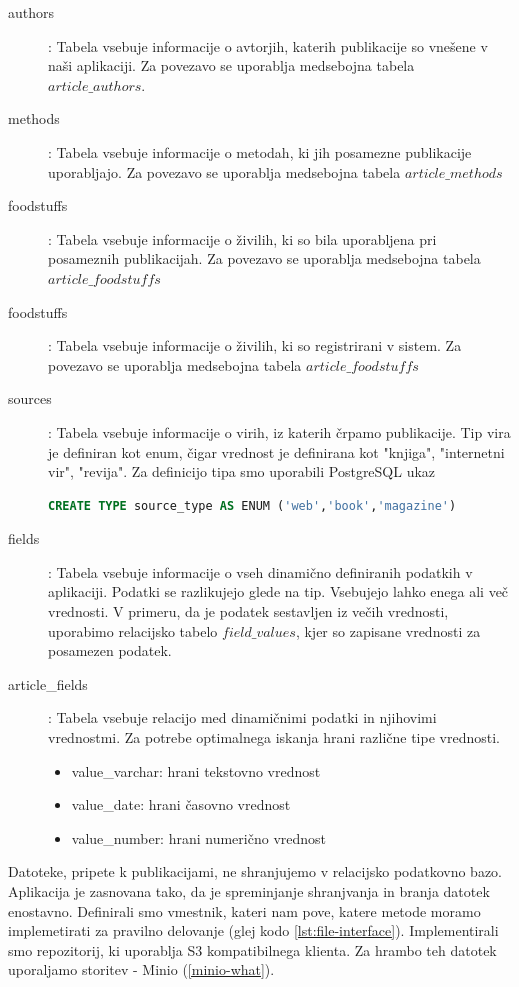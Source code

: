 \documentclass[a4paper, 12pt]{book}
\newenvironment{myitemize}
{ \begin{itemize}
    \setlength{\itemsep}{2pt}
    \setlength{\parskip}{0pt}
    \setlength{\parsep}{2pt}     }
{ \end{itemize}                  }
\begin{document}
\begin{description}
\item[authors]: Tabela vsebuje informacije o avtorjih, katerih publikacije so vnešene v naši aplikaciji. Za povezavo se uporablja medsebojna tabela $article\_authors$.

\item[methods]: Tabela vsebuje informacije o metodah, ki jih posamezne publikacije uporabljajo. Za povezavo se uporablja medsebojna tabela $article\_methods$

\item[foodstuffs]: Tabela vsebuje informacije o živilih, ki so bila uporabljena pri posameznih publikacijah. Za povezavo se uporablja medsebojna tabela $article\_foodstuffs$

\item[foodstuffs]: Tabela vsebuje informacije o živilih, ki so registrirani v sistem. Za povezavo se uporablja medsebojna tabela $article\_foodstuffs$

\item[sources]: Tabela vsebuje informacije o virih, iz katerih črpamo publikacije. Tip vira je definiran kot enum, čigar vrednost je definirana kot "knjiga", "internetni vir", "revija". Za definicijo tipa smo uporabili PostgreSQL ukaz
\begin{lstlisting}[language=sql, style=mystyle]
CREATE TYPE source_type AS ENUM ('web','book','magazine')
\end{lstlisting}

\item[fields]: Tabela vsebuje informacije o vseh dinamično definiranih podatkih v aplikaciji. Podatki se razlikujejo glede na tip. Vsebujejo lahko enega ali več vrednosti. V primeru, da je podatek sestavljen iz večih vrednosti, uporabimo relacijsko tabelo $field\_values$, kjer so zapisane vrednosti za posamezen podatek.

\item[article\_fields]: Tabela vsebuje relacijo med dinamičnimi podatki in njihovimi vrednostmi. Za potrebe optimalnega iskanja hrani različne tipe vrednosti. 
\begin{myitemize}
    \item value\_varchar: hrani tekstovno vrednost 
    \item value\_date: hrani časovno vrednost
    \item value\_number: hrani numerično vrednost
\end{myitemize}
\end{description}

Datoteke, pripete k publikacijami, ne shranjujemo v relacijsko podatkovno bazo. Aplikacija je zasnovana tako, da je spreminjanje shranjvanja in branja datotek enostavno. Definirali smo vmestnik, kateri nam pove, katere metode moramo implemetirati za pravilno delovanje (glej kodo \ref{lst:file-interface}). Implementirali smo repozitorij, ki uporablja S3 kompatibilnega klienta. Za hrambo teh datotek uporaljamo storitev - Minio (\ref{minio-what}).
\end{document}
